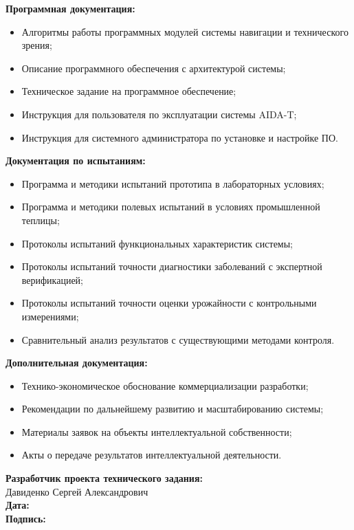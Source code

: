 \documentclass[12pt,a4paper]{article}
\begin{document}
\textbf{Программная документация:}
\begin{itemize}
\item Алгоритмы работы программных модулей системы навигации и технического зрения;
\item Описание программного обеспечения с архитектурой системы;
\item Техническое задание на программное обеспечение;
\item Инструкция для пользователя по эксплуатации системы AIDA-T;
\item Инструкция для системного администратора по установке и настройке ПО.
\end{itemize}

\textbf{Документация по испытаниям:}
\begin{itemize}
\item Программа и методики испытаний прототипа в лабораторных условиях;
\item Программа и методики полевых испытаний в условиях промышленной теплицы;
\item Протоколы испытаний функциональных характеристик системы;
\item Протоколы испытаний точности диагностики заболеваний с экспертной верификацией;
\item Протоколы испытаний точности оценки урожайности с контрольными измерениями;
\item Сравнительный анализ результатов с существующими методами контроля.
\end{itemize}

\textbf{Дополнительная документация:}
\begin{itemize}
\item Технико-экономическое обоснование коммерциализации разработки;
\item Рекомендации по дальнейшему развитию и масштабированию системы;
\item Материалы заявок на объекты интеллектуальной собственности;
\item Акты о передаче результатов интеллектуальной деятельности.
\end{itemize}

\vfill

\begin{center}
\textbf{Разработчик проекта технического задания:} \\
Давиденко Сергей Александрович \\[1em]
\textbf{Дата:} \underline{\hspace{3cm}} \\[1em]
\textbf{Подпись:} \underline{\hspace{5cm}}
\end{center}
\end{document}
